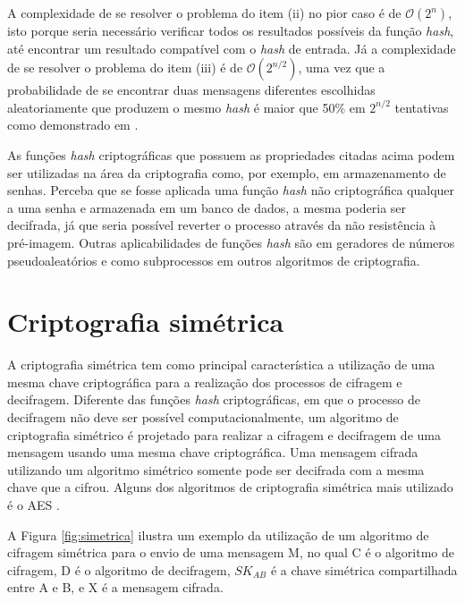     A complexidade de se resolver o problema do item (ii) no pior caso é de $\mathcal{O}(2^n)$, isto porque seria necessário verificar todos os resultados possíveis da função \textit{hash}, até encontrar um resultado compatível com o \textit{hash} de entrada. Já a complexidade de se resolver o problema do item (iii) é de $\mathcal{O}(2^{n/2})$, uma vez que a probabilidade de se encontrar duas mensagens diferentes escolhidas aleatoriamente que produzem o mesmo \textit{hash} é maior que 50\% em $2^{n/2}$ tentativas como demonstrado em \cite{hash_n/2, criptografia_e_seguranca_de_redes}. 

    As funções \textit{hash} criptográficas que possuem as propriedades citadas acima podem ser utilizadas na área da criptografia como, por exemplo, em armazenamento de senhas. Perceba que se fosse aplicada uma função \textit{hash} não criptográfica qualquer a uma senha e armazenada em um banco de dados, a mesma poderia ser decifrada, já que seria possível reverter o processo através da não resistência à pré-imagem. Outras aplicabilidades de funções \textit{hash} são em geradores de números pseudoaleatórios e como subprocessos em outros algoritmos de criptografia.

\section{Criptografia simétrica}
    A criptografia simétrica tem como principal característica a utilização de uma mesma chave criptográfica para a realização dos processos de cifragem e decifragem. Diferente das funções \textit{hash} criptográficas, em que o processo de decifragem não deve ser possível computacionalmente, um algoritmo de criptografia simétrico é projetado para realizar a cifragem e decifragem de uma mensagem usando uma mesma chave criptográfica. Uma mensagem cifrada utilizando um algoritmo simétrico somente pode ser decifrada com a mesma chave que a cifrou. Alguns dos algoritmos de criptografia simétrica mais utilizado é o AES \cite{aes}.

    A Figura \ref{fig:simetrica} ilustra um exemplo da utilização de um algoritmo de cifragem simétrica para o envio de uma mensagem M, no qual C é o algoritmo de cifragem, D é o algoritmo de decifragem, $SK_{AB}$ é a chave simétrica compartilhada entre A e B, e X é a mensagem cifrada.

